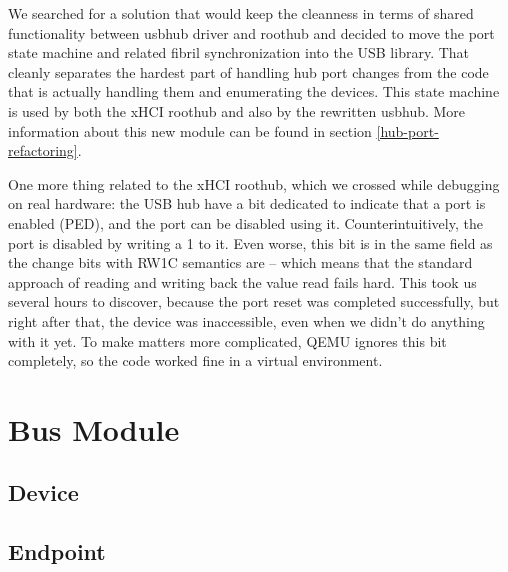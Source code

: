 We searched for a solution that would keep the cleanness in terms of shared
functionality between usbhub driver and roothub and decided to move the port
state machine and related fibril synchronization into the USB library. That
cleanly separates the hardest part of handling hub port changes from the code
that is actually handling them and enumerating the devices. This state machine
is used by both the xHCI roothub and also by the rewritten usbhub. More
information about this new module can be found in section \ref{hub-port-refactoring}.

One more thing related to the xHCI roothub, which we crossed while debugging on
real hardware: the USB hub have a bit dedicated to indicate that a port is
enabled (PED), and the port can be disabled using it. Counterintuitively, the
port is disabled by writing a 1 to it. Even worse, this bit is in the same
field as the change bits with RW1C semantics are -- which means that the
standard approach of reading and writing back the value read fails hard. This
took us several hours to discover, because the port reset was completed
successfully, but right after that, the device was inaccessible, even when we
didn't do anything with it yet. To make matters more complicated, QEMU ignores
this bit completely, so the code worked fine in a virtual environment.

\section{Bus Module}


\subsection{Device}


\subsection{Endpoint}



